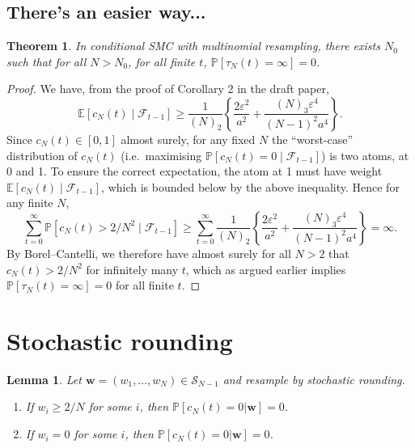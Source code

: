 \documentclass{article}
\newtheorem{thm}{Theorem}
\newtheorem{lemma}{Lemma}
\newcommand{\PR}{\mathbb{P}}
\newcommand{\E}{\mathbb{E}}
\begin{document}
\subsection*{There's an easier way...}

\begin{thm}
In conditional SMC with multinomial resampling, there exists $N_0$ such that for all $N>N_0$, for all finite $t$, $\PR[\tau_N(t) = \infty] =0$.
\end{thm}

\begin{proof}
We have, from the proof of Corollary 2 in the draft paper,
\begin{equation*}
\E [c_N(t) \mid \mathcal{F}_{t-1}] \geq \frac{1}{(N)_2} \left\{ \frac{2\varepsilon^2}{a^2} + \frac{(N)_3 \varepsilon^4}{(N-1)^2 a^4} \right\} .
\end{equation*}
Since $c_N(t) \in [0,1]$ almost surely, for any fixed $N$ the ``worst-case'' distribution of $c_N(t)$ (i.e.\ maximising $\PR[c_N(t)=0 \mid \mathcal{F}_{t-1}]$) is two atoms, at 0 and 1. To ensure the correct expectation, the atom at 1 must have weight $\E[c_N(t) \mid \mathcal{F}_{t-1}]$, which is bounded below by the above inequality.
Hence for any finite $N$,
\begin{equation*}
\sum_{t=0}^\infty \PR[ c_N(t) > 2/N^2 \mid \mathcal{F}_{t-1}] 
\geq \sum_{t=0}^\infty \frac{1}{(N)_2} \left\{ \frac{2\varepsilon^2}{a^2} + \frac{(N)_3 \varepsilon^4}{(N-1)^2 a^4} \right\}
= \infty .
\end{equation*}
By Borel--Cantelli, we therefore have almost surely for all $N>2$ that $c_N(t) > 2/N^2$ for infinitely many $t$, which as argued earlier implies $\PR[\tau_N(t) = \infty] =0$ for all finite $t$.
\end{proof}


\section*{Stochastic rounding}
\begin{lemma} \label{lem:extreme_w_coal_as}
Let $\mathbf{w} = (w_1,\dots,w_N) \in \mathcal{S}_{N-1}$ and resample by stochastic rounding.
\begin{enumerate}[label=(\roman*)]
\item If $w_i \geq 2/N$ for some $i$, then $\PR[c_N(t) =0 |\mathbf{w} ] =0$. \label{item:SR_weight_2}
\item If $w_i= 0$ for some $i$, then $\PR[c_N(t) =0 |\mathbf{w} ] =0$. \label{item:SR_weight_0}
\end{enumerate}
\end{lemma}
\end{document}
